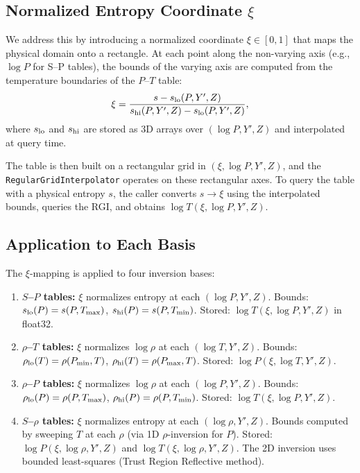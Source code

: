 \documentclass[twocolumn]{aastex701}
\begin{document}
\subsection{Normalized Entropy Coordinate $\xi$}\label{sec:xi}

We address this by introducing a normalized coordinate $\xi \in [0, 1]$ that maps the physical domain onto a rectangle.
At each point along the non-varying axis (e.g., $\log P$ for S--P tables), the bounds of the varying axis are computed from the temperature boundaries of the $P$--$T$ table:
\begin{equation}\label{eq:xi}
    \xi = \frac{s - s_{\rm lo}(P, Y', Z)}{s_{\rm hi}(P, Y', Z) - s_{\rm lo}(P, Y', Z)},
\end{equation}
where $s_{\rm lo}$ and $s_{\rm hi}$ are stored as 3D arrays over $(\log P, Y', Z)$ and interpolated at query time.

The table is then built on a rectangular grid in $(\xi, \log P, Y', Z)$, and the \texttt{RegularGridInterpolator} operates on these rectangular axes.
To query the table with a physical entropy $s$, the caller converts $s \to \xi$ using the interpolated bounds, queries the RGI, and obtains $\log T(\xi, \log P, Y', Z)$.

\subsection{Application to Each Basis}\label{sec:xi_basis}

The $\xi$-mapping is applied to four inversion bases:

\begin{enumerate}
    \item \textbf{$S$--$P$ tables:} $\xi$ normalizes entropy at each $(\log P, Y', Z)$.
    Bounds: $s_{\rm lo}(P) = s(P, T_{\rm max})$, $s_{\rm hi}(P) = s(P, T_{\rm min})$.
    Stored: $\log T(\xi, \log P, Y', Z)$ in float32.

    \item \textbf{$\rho$--$T$ tables:} $\xi$ normalizes $\log\rho$ at each $(\log T, Y', Z)$.
    Bounds: $\rho_{\rm lo}(T) = \rho(P_{\rm min}, T)$, $\rho_{\rm hi}(T) = \rho(P_{\rm max}, T)$.
    Stored: $\log P(\xi, \log T, Y', Z)$.

    \item \textbf{$\rho$--$P$ tables:} $\xi$ normalizes $\log\rho$ at each $(\log P, Y', Z)$.
    Bounds: $\rho_{\rm lo}(P) = \rho(P, T_{\rm max})$, $\rho_{\rm hi}(P) = \rho(P, T_{\rm min})$.
    Stored: $\log T(\xi, \log P, Y', Z)$.

    \item \textbf{$S$--$\rho$ tables:} $\xi$ normalizes entropy at each $(\log\rho, Y', Z)$.
    Bounds computed by sweeping $T$ at each $\rho$ (via 1D $\rho$-inversion for $P$).
    Stored: $\log P(\xi, \log\rho, Y', Z)$ and $\log T(\xi, \log\rho, Y', Z)$.
    The 2D inversion uses bounded least-squares (Trust Region Reflective method).
\end{enumerate}
\end{document}
